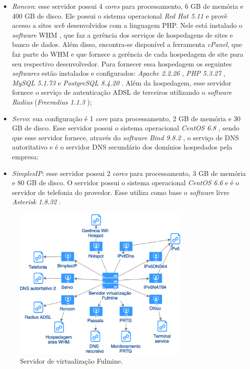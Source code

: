 \begin{itemize}
 \item \textit{Roncon}: esse servidor possui 4 \textit{cores} para processamento, 6 GB de memória e 400 GB de disco. Ele possui o sistema
 operacional \textit{Red Hat 5.11} \cite{redhat} e provê acesso a sites \textit{web} desenvolvidos com a linguagem \ac{PHP}. Nele está instalado 
 o \textit{software} \ac{WHM} \cite{whm}, que faz a gerência dos serviços de hospedagens de sites e banco de dados. Além disso, encontra-se 
 disponível a ferramenta \textit{cPanel}, que faz parte do \ac{WHM} e que fornece a gerência de cada hospedagem de site para seu respectivo 
 desenvolvedor. Para fornecer essa hospedagem os seguintes \textit{softwares} estão instalados e configurados: \textit{Apache 2.2.26} \cite{apache}, 
 \textit{\ac{PHP} 5.3.27} \cite{php}, \textit{MySQL 5.1.73} \cite{mysql} e \textit{PostgreSQL 8.4.20} \cite{postgres}.
 Além da hospedagem, esse servidor fornece o serviço de autenticação \ac{ADSL} de terceiros utilizando o \textit{software} \textit{Radius} 
 (\textit{Freeradius 1.1.3} \cite{freeradius});
 
 \item \textit{Servo}: sua configuração é 1 \textit{core} para processamento, 2 GB de memória e 30 GB de disco. Esse servidor possui o 
 sistema operacional \textit{CentOS 6.8} \cite{centos}, sendo que esse servidor fornece, através do \textit{software} \textit{Bind 9.8.2} 
 \cite{bind}, o serviço de \ac{DNS} autoritativo e é o servidor \ac{DNS} secundário dos domínios hospedados pela empresa;
 
 \item \textit{SimplesIP}: esse servidor possui 2 \textit{cores} para processamento, 3 GB de memória e 80 GB de disco. O servidor possui 
 o sistema operacional \textit{CentOS 6.6} \cite{centos} e é o servidor de telefonia do provedor. Esse utiliza como base o \textit{software} 
 livre \textit{Asterisk 1.8.32} \cite{asterisk}.
\end{itemize}

\begin{figure}[h!]
 \centering
 \includegraphics[width=330px]{img/servidor_fulmine.eps}
 \caption{Servidor de virtualização Fulmine.}
 \label{fig:servidor_fulmine}
\end{figure}

